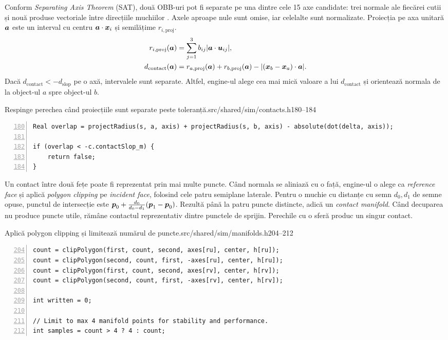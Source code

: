 \documentclass[11pt,a4paper]{article}
\begin{document}
Conform \emph{Separating Axis Theorem} (SAT), două OBB-uri pot fi separate pe una dintre cele 15 axe candidate:
trei normale ale fiecărei cutii și nouă produse vectoriale între
direcțiile muchiilor \cite{obb}. Axele aproape nule sunt omise, iar
celelalte sunt normalizate. Proiecția pe axa unitară \(\boldsymbol{a}\)
este un interval cu centru \(\boldsymbol{a}\cdot\boldsymbol{x}_i\) și
semilățime \(r_{i,\mathrm{proj}}\).
\begin{align}
 r_{i,\mathrm{proj}}(\boldsymbol{a})&=\sum_{j=1}^3 b_{ij}|\boldsymbol{a}\cdot\boldsymbol{u}_{ij}|,\\
 d_{\mathrm{contact}}(\boldsymbol{a})&=r_{a,\mathrm{proj}}(\boldsymbol{a})+r_{b,\mathrm{proj}}(\boldsymbol{a})-
        |(\boldsymbol{x}_b-\boldsymbol{x}_a)\cdot\boldsymbol{a}|.
\end{align}
Dacă \(d_{\mathrm{contact}}<-d_{\mathrm{slop}}\) pe o axă, intervalele sunt separate.
Altfel, engine-ul alege cea mai mică valoare a lui \(d_{\mathrm{contact}}\) și
orientează normala de la object-ul \(a\) spre object-ul \(b\).
\begin{codefragment}{Respinge perechea când proiecțiile sunt separate peste toleranță.}{src/shared/sim/contacts.h}{180--184}
\begin{lstlisting}[numbers=left,firstnumber=180]
Real overlap = projectRadius(s, a, axis) + projectRadius(s, b, axis) - absolute(dot(delta, axis));

if (overlap < -c.contactSlop_m) {
    return false;
}
\end{lstlisting}
\end{codefragment}

Un contact între două fețe poate fi reprezentat prin mai multe
puncte. Când normala se aliniază cu o față, engine-ul o alege ca
\emph{reference face} și aplică \emph{polygon clipping} pe
\emph{incident face}, folosind cele patru semiplane laterale.
Pentru o muchie cu distanțe cu semn \(d_0,d_1\) de
semne opuse, punctul de intersecție este
\(\boldsymbol{p}_0+\tfrac{d_0}{d_0-d_1}(\boldsymbol{p}_1-\boldsymbol{p}_0)\).
Rezultă până la patru puncte distincte, adică un \emph{contact manifold}. Când decuparea nu produce puncte utile, rămâne
contactul reprezentativ dintre punctele de sprijin. Perechile
cu o sferă produc un singur contact.
\begin{codefragment}{Aplică polygon clipping și limitează numărul de puncte.}{src/shared/sim/manifolds.h}{204--212}
\begin{lstlisting}[numbers=left,firstnumber=204]
count = clipPolygon(first, count, second, axes[ru], center, h[ru]);
count = clipPolygon(second, count, first, -axes[ru], center, h[ru]);
count = clipPolygon(first, count, second, axes[rv], center, h[rv]);
count = clipPolygon(second, count, first, -axes[rv], center, h[rv]);

int written = 0;

// Limit to max 4 manifold points for stability and performance.
int samples = count > 4 ? 4 : count;
\end{lstlisting}
\end{codefragment}
\end{document}
